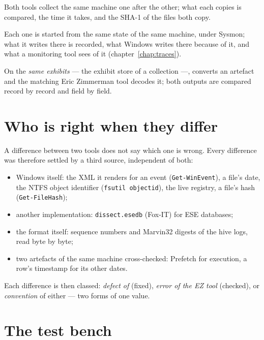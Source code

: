 \documentclass[11pt,a4paper,oneside]{report}
\begin{document}
\begin{description}[style=nextline,leftmargin=1em]
  \item[Collection: \wac{} against KAPE] Both tools collect the same machine
        one after the other; what each copies is compared, the time it takes,
        and the SHA-1 of the files both copy.
  \item[Traces left: \wac{}, KAPE and the EZ tools] Each one is started from the
        same state of the same machine, under Sysmon; what it writes there is
        recorded, what Windows writes there because of it, and what a
        monitoring tool sees of it (chapter~\ref{chap:traces}).
  \item[Decoding: \wac{} against the EZ tools] On the \emph{same exhibits} ---
        the exhibit store of a \wac{} collection ---, \wac{} converts an artefact
        and the matching Eric Zimmerman tool decodes it; both outputs are compared
        record by record and field by field.
\end{description}

\section{Who is right when they differ}

A difference between two tools does not say which one is wrong. Every difference
was therefore settled by a third source, independent of both:

\begin{itemize}[nosep]
  \item Windows itself: the XML it renders for an event (\texttt{Get-WinEvent}),
        a file's date, the NTFS object identifier (\texttt{fsutil objectid}), the
        live registry, a file's hash (\texttt{Get-FileHash});
  \item another implementation: \texttt{dissect.esedb} (Fox-IT) for ESE
        databases;
  \item the format itself: sequence numbers and Marvin32 digests of the hive
        logs, read byte by byte;
  \item two artefacts of the same machine cross-checked: Prefetch for execution,
        a row's timestamp for its other dates.
\end{itemize}

Each difference is then classed: \emph{defect of \wac{}} (fixed), \emph{error of
the EZ tool} (checked), or \emph{convention} of either --- two forms of one value.

\section{The test bench}
\end{document}
